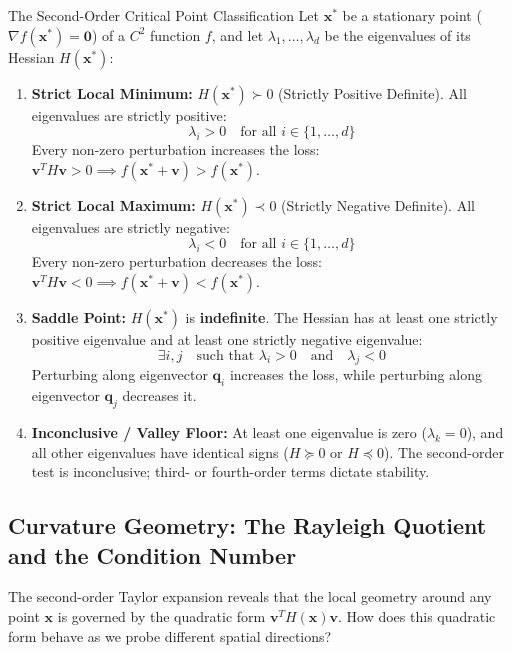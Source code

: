 \begin{theorembox}{The Second-Order Critical Point Classification}
Let $\mathbf{x}^*$ be a stationary point ($\nabla f(\mathbf{x}^*) = \mathbf{0}$) of a $C^2$ function $f$, and let $\lambda_1, \dots, \lambda_d$ be the eigenvalues of its Hessian $H(\mathbf{x}^*)$:
\begin{enumerate}
    \item \textbf{Strict Local Minimum:} $H(\mathbf{x}^*) \succ 0$ (Strictly Positive Definite). All eigenvalues are strictly positive:
    \begin{equation}
    \lambda_i > 0 \quad \text{for all } i \in \{1, \dots, d\}
    \end{equation}
    Every non-zero perturbation increases the loss: $\mathbf{v}^T H \mathbf{v} > 0 \implies f(\mathbf{x}^* + \mathbf{v}) > f(\mathbf{x}^*)$.
    
    \item \textbf{Strict Local Maximum:} $H(\mathbf{x}^*) \prec 0$ (Strictly Negative Definite). All eigenvalues are strictly negative:
    \begin{equation}
    \lambda_i < 0 \quad \text{for all } i \in \{1, \dots, d\}
    \end{equation}
    Every non-zero perturbation decreases the loss: $\mathbf{v}^T H \mathbf{v} < 0 \implies f(\mathbf{x}^* + \mathbf{v}) < f(\mathbf{x}^*)$.

    \item \textbf{Saddle Point:} $H(\mathbf{x}^*)$ is \textbf{indefinite}. The Hessian has at least one strictly positive eigenvalue and at least one strictly negative eigenvalue:
    \begin{equation}
    \exists i, j \quad \text{such that } \lambda_i > 0 \quad \text{and} \quad \lambda_j < 0
    \end{equation}
    Perturbing along eigenvector $\mathbf{q}_i$ increases the loss, while perturbing along eigenvector $\mathbf{q}_j$ decreases it.

    \item \textbf{Inconclusive / Valley Floor:} At least one eigenvalue is zero ($\lambda_k = 0$), and all other eigenvalues have identical signs ($H \succeq 0$ or $H \preceq 0$). The second-order test is inconclusive; third- or fourth-order terms dictate stability.
\end{enumerate}
\end{theorembox}

\subsection{Curvature Geometry: The Rayleigh Quotient and the Condition Number}
The second-order Taylor expansion reveals that the local geometry around any point $\mathbf{x}$ is governed by the quadratic form $\mathbf{v}^T H(\mathbf{x})\mathbf{v}$. How does this quadratic form behave as we probe different spatial directions?

